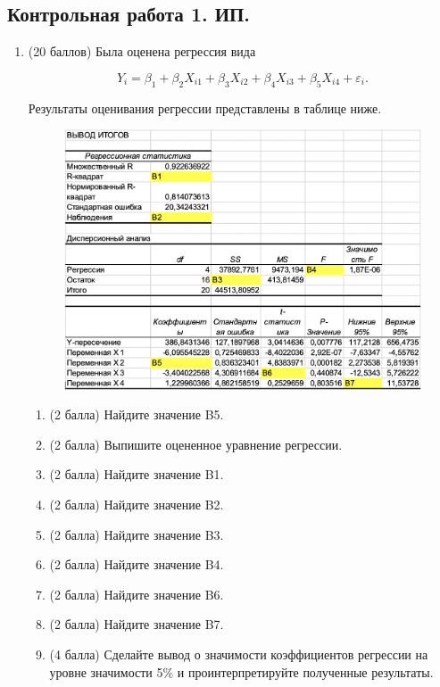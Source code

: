 
\subsection{Контрольная работа 1. ИП.}

\begin{enumerate}
\item (20 баллов) Была оценена регрессия вида

\[
Y_i = \beta_1 + \beta_2X_{i1} + \beta_3X_{i2} + \beta_4X_{i3} + \beta_5X_{i4} + \varepsilon_i.
\]

Результаты оценивания регрессии представлены в таблице ниже.

\begin{figure}[h]
	\begin{center}
				\includegraphics[scale=0.5]{figures/2022-2023_kr1.png}
	\end{center}
\end{figure}

\begin{enumerate}
\item (2 балла) Найдите значение B5.
\item (2 балла) Выпишите оцененное уравнение регрессии.
\item (2 балла) Найдите значение B1.
\item (2 балла) Найдите значение B2.
\item (2 балла) Найдите значение B3.
\item (2 балла) Найдите значение B4.
\item (2 балла) Найдите значение B6.
\item (2 балла) Найдите значение B7.
\item (4 балла) Сделайте вывод о значимости коэффициентов регрессии на уровне значимости 5\% и проинтерпретируйте полученные результаты.
\end{enumerate}


\end{enumerate}
